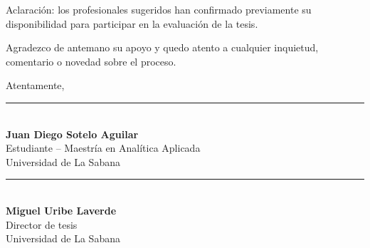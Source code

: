 \documentclass[11pt,letterpaper]{article}
\begin{document}
Aclaración: los profesionales sugeridos han confirmado previamente su disponibilidad para participar en la evaluación de la tesis.

Agradezco de antemano su apoyo y quedo atento a cualquier inquietud, comentario o novedad sobre el proceso.

\vspace{0.6cm}

Atentamente,

\vspace{1.2cm}

\begin{minipage}[t]{0.45\textwidth}
    \rule{6cm}{0.4pt}\\[0.1cm]
    \textbf{Juan Diego Sotelo Aguilar}\\
    {\small Estudiante -- Maestría en Analítica Aplicada\\
    Universidad de La Sabana}
\end{minipage}
\hfill
\begin{minipage}[t]{0.45\textwidth}
    \rule{6cm}{0.4pt}\\[0.1cm]
    \textbf{Miguel Uribe Laverde}\\
    {\small Director de tesis\\
    Universidad de La Sabana}
\end{minipage}
\end{document}
